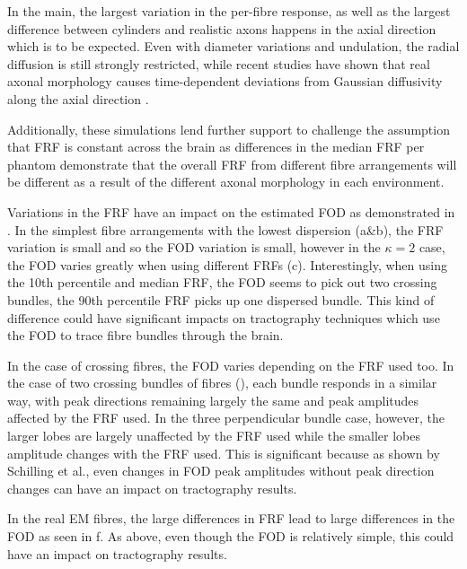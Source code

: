 In the main, the largest variation in the per-fibre response, as well as the largest difference between cylinders and realistic axons happens in the axial direction which is to be expected. Even with diameter variations and undulation, the radial diffusion is still strongly restricted, while recent studies have shown that real axonal morphology causes time-dependent deviations from Gaussian diffusivity along the axial direction \cite{Lee2019a}.

Additionally, these simulations lend further support to challenge the assumption that \ac{FRF} is constant across the brain as differences in the median \ac{FRF} per phantom demonstrate that the overall \ac{FRF} from different fibre arrangements will be different as a result of the different axonal morphology in each environment.

Variations in the \ac{FRF} have an impact on the estimated \ac{FOD} as demonstrated in . In the simplest fibre arrangements with the lowest dispersion (a\&b), the \ac{FRF} variation is small and so the \ac{FOD} variation is small, however in the $\kappa=2$ case, the \ac{FOD} varies greatly when using different \ac{FRF}s (c).
Interestingly, when using the 10th percentile and median \ac{FRF}, the \ac{FOD} seems to pick out two crossing bundles, the 90th percentile \ac{FRF} picks up one dispersed bundle. This kind of difference could have significant impacts on tractography techniques which use the \ac{FOD} to trace fibre bundles through the brain.

In the case of crossing fibres, the \ac{FOD} varies depending on the \ac{FRF} used too. In the case of two crossing bundles of fibres (), each bundle responds in a similar way, with peak directions remaining largely the same and peak amplitudes affected by the \ac{FRF} used. In the three perpendicular bundle case, however, the larger lobes are largely unaffected by the \ac{FRF} used while the smaller lobes amplitude changes with the \ac{FRF} used. This is significant because as shown by Schilling et al.\cite{Schilling2019}, even changes in \ac{FOD} peak amplitudes without peak direction changes can have an impact on tractography results.

In the real \ac{EM} fibres, the large differences in \ac{FRF} lead to large differences in the \ac{FOD} as seen in f. As above, even though the \ac{FOD} is relatively simple, this could have an impact on tractography results. 

